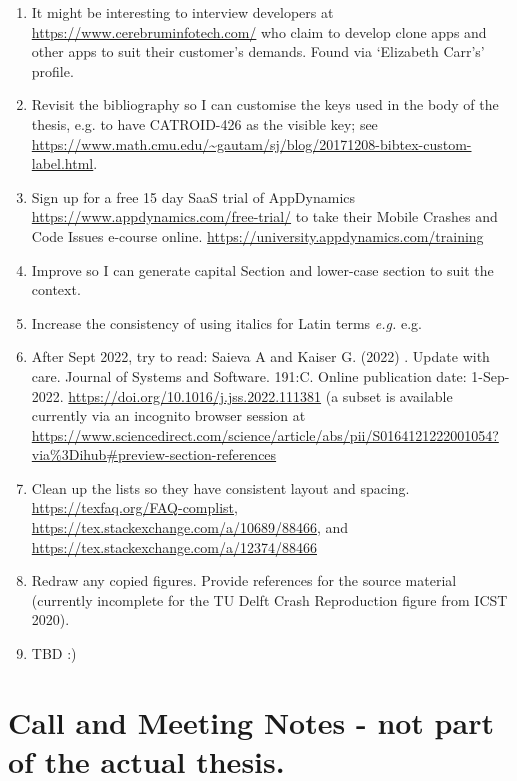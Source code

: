 \begin{enumerate}
    \item It might be interesting to interview developers at \url{https://www.cerebruminfotech.com/} who claim to develop clone apps and other apps to suit their customer's demands. Found via `Elizabeth Carr's' profile. 
    
    \item Revisit the bibliography so I can customise the keys used in the body of the thesis, e.g. to have CATROID-426 as the visible key; see \url{https://www.math.cmu.edu/~gautam/sj/blog/20171208-bibtex-custom-label.html}.
    
    \item Sign up for a free 15 day SaaS trial of AppDynamics \url{https://www.appdynamics.com/free-trial/} to take their Mobile Crashes and Code Issues e-course online. \url{https://university.appdynamics.com/training}
    
    \item Improve  so I can generate capital Section and lower-case section to suit the context.
    
    \item Increase the consistency of using italics for Latin terms \emph{e.g.} e.g.
    
    \item After  Sept 2022, try to read: Saieva A and Kaiser G. (2022) . Update with care. Journal of Systems and Software. 191:C. Online publication date: 1-Sep-2022. \url{https://doi.org/10.1016/j.jss.2022.111381} (a subset is available currently via an incognito browser session at \url{https://www.sciencedirect.com/science/article/abs/pii/S0164121222001054?via\%3Dihub\#preview-section-references}
    
    \item Clean up the lists so they have consistent layout and spacing. \url{https://texfaq.org/FAQ-complist}, \url{https://tex.stackexchange.com/a/10689/88466}, and \url{https://tex.stackexchange.com/a/12374/88466}

    \item Redraw any copied figures. Provide references for the source material (currently incomplete for the TU Delft Crash Reproduction figure from ICST 2020).
    
    \item TBD :)

\end{enumerate}

\clearpage
\section{Call and Meeting Notes - not part of the actual thesis.}

